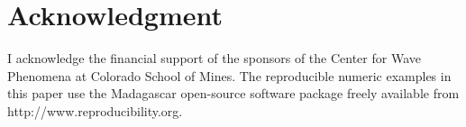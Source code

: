\section{Acknowledgment}
I acknowledge the financial support of the sponsors of the Center for
Wave Phenomena at Colorado School of Mines. The reproducible numeric
examples in this paper use the Madagascar open-source software package
freely available from http://www.reproducibility.org.

